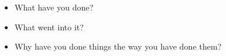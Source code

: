 \begin{itemize}
    \item What have you done?
    \item What went into it?
    \item Why have you done things the way you have done them?
\end{itemize}